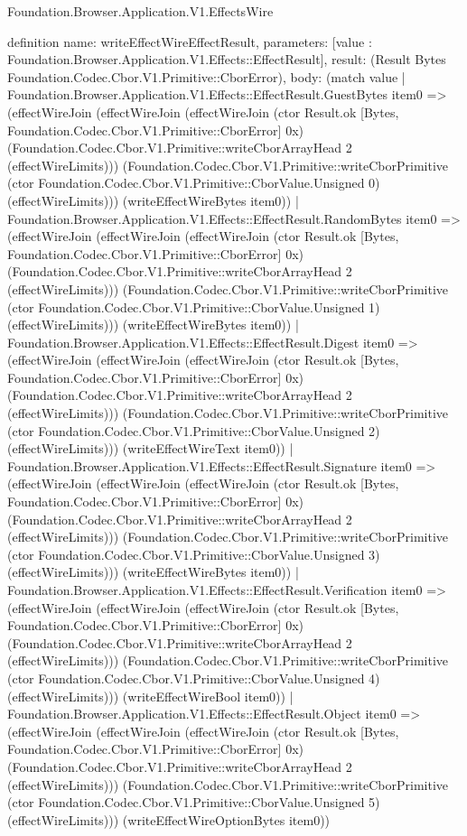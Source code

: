 \begin{lexlean}{Foundation.Browser.Application.V1.EffectsWire}
\begin{semanticmodule}
definition{
  name: writeEffectWireEffectResult,
  parameters: [value : Foundation.Browser.Application.V1.Effects::EffectResult],
  result: (Result Bytes Foundation.Codec.Cbor.V1.Primitive::CborError),
  body: (match value
    | Foundation.Browser.Application.V1.Effects::EffectResult.GuestBytes item0 => (effectWireJoin (effectWireJoin (effectWireJoin (ctor Result.ok [Bytes, Foundation.Codec.Cbor.V1.Primitive::CborError] 0x) (Foundation.Codec.Cbor.V1.Primitive::writeCborArrayHead 2 (effectWireLimits))) (Foundation.Codec.Cbor.V1.Primitive::writeCborPrimitive (ctor Foundation.Codec.Cbor.V1.Primitive::CborValue.Unsigned 0) (effectWireLimits))) (writeEffectWireBytes item0))
    | Foundation.Browser.Application.V1.Effects::EffectResult.RandomBytes item0 => (effectWireJoin (effectWireJoin (effectWireJoin (ctor Result.ok [Bytes, Foundation.Codec.Cbor.V1.Primitive::CborError] 0x) (Foundation.Codec.Cbor.V1.Primitive::writeCborArrayHead 2 (effectWireLimits))) (Foundation.Codec.Cbor.V1.Primitive::writeCborPrimitive (ctor Foundation.Codec.Cbor.V1.Primitive::CborValue.Unsigned 1) (effectWireLimits))) (writeEffectWireBytes item0))
    | Foundation.Browser.Application.V1.Effects::EffectResult.Digest item0 => (effectWireJoin (effectWireJoin (effectWireJoin (ctor Result.ok [Bytes, Foundation.Codec.Cbor.V1.Primitive::CborError] 0x) (Foundation.Codec.Cbor.V1.Primitive::writeCborArrayHead 2 (effectWireLimits))) (Foundation.Codec.Cbor.V1.Primitive::writeCborPrimitive (ctor Foundation.Codec.Cbor.V1.Primitive::CborValue.Unsigned 2) (effectWireLimits))) (writeEffectWireText item0))
    | Foundation.Browser.Application.V1.Effects::EffectResult.Signature item0 => (effectWireJoin (effectWireJoin (effectWireJoin (ctor Result.ok [Bytes, Foundation.Codec.Cbor.V1.Primitive::CborError] 0x) (Foundation.Codec.Cbor.V1.Primitive::writeCborArrayHead 2 (effectWireLimits))) (Foundation.Codec.Cbor.V1.Primitive::writeCborPrimitive (ctor Foundation.Codec.Cbor.V1.Primitive::CborValue.Unsigned 3) (effectWireLimits))) (writeEffectWireBytes item0))
    | Foundation.Browser.Application.V1.Effects::EffectResult.Verification item0 => (effectWireJoin (effectWireJoin (effectWireJoin (ctor Result.ok [Bytes, Foundation.Codec.Cbor.V1.Primitive::CborError] 0x) (Foundation.Codec.Cbor.V1.Primitive::writeCborArrayHead 2 (effectWireLimits))) (Foundation.Codec.Cbor.V1.Primitive::writeCborPrimitive (ctor Foundation.Codec.Cbor.V1.Primitive::CborValue.Unsigned 4) (effectWireLimits))) (writeEffectWireBool item0))
    | Foundation.Browser.Application.V1.Effects::EffectResult.Object item0 => (effectWireJoin (effectWireJoin (effectWireJoin (ctor Result.ok [Bytes, Foundation.Codec.Cbor.V1.Primitive::CborError] 0x) (Foundation.Codec.Cbor.V1.Primitive::writeCborArrayHead 2 (effectWireLimits))) (Foundation.Codec.Cbor.V1.Primitive::writeCborPrimitive (ctor Foundation.Codec.Cbor.V1.Primitive::CborValue.Unsigned 5) (effectWireLimits))) (writeEffectWireOptionBytes item0))
}
\end{semanticmodule}
\end{lexlean}
